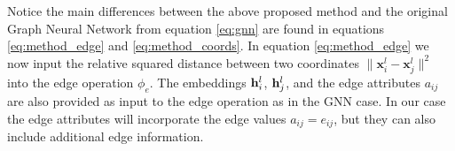 

 
Notice the main differences between the above proposed method and the original Graph Neural Network from equation \ref{eq:gnn} are found in equations \ref{eq:method_edge} and \ref{eq:method_coords}. In equation \ref{eq:method_edge} we now input the relative squared distance between two coordinates $\|\mathbf{x}_{i}^{l}-\mathbf{x}_{j}^{l}\|^{2}$ into the edge operation $\phi_e$. The embeddings $\mathbf{h}_i^l$, $\mathbf{h}_j^l$, and the edge attributes $a_{ij}$ are also provided as input to the edge operation as in the GNN case. In our case the edge attributes will incorporate the edge values $a_{ij} = e_{ij}$, but they can also include additional edge information.

